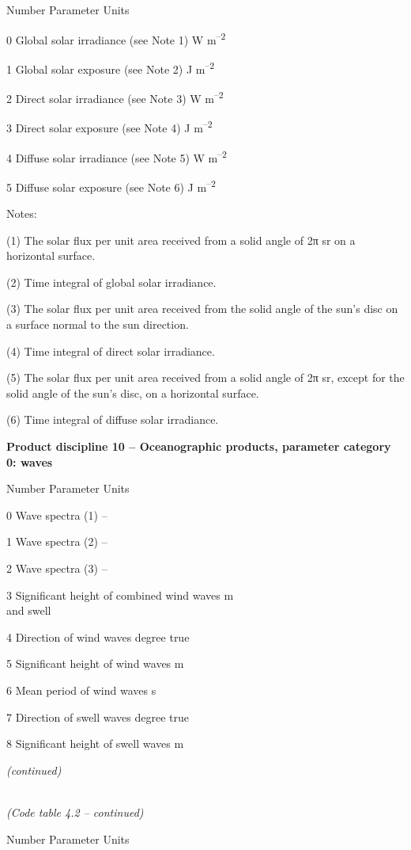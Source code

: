 Number Parameter Units

0 Global solar irradiance (see Note 1) W m\textsuperscript{--2}

1 Global solar exposure (see Note 2) J m\textsuperscript{--2}

2 Direct solar irradiance (see Note 3) W m\textsuperscript{--2}

3 Direct solar exposure (see Note 4) J m\textsuperscript{--2}

4 Diffuse solar irradiance (see Note 5) W m\textsuperscript{--2}

5 Diffuse solar exposure (see Note 6) J m\textsuperscript{--2}

Notes:

(1) The solar flux per unit area received from a solid angle of 2π sr on a horizontal surface.

(2) Time integral of global solar irradiance.

(3) The solar flux per unit area received from the solid angle of the sun's disc on a surface normal to the sun direction.

(4) Time integral of direct solar irradiance.

(5) The solar flux per unit area received from a solid angle of 2π sr, except for the solid angle of the sun's disc, on a horizontal surface.

(6) Time integral of diffuse solar irradiance.

\textbf{Product discipline 10 -- Oceanographic products, parameter category 0: waves}

Number Parameter Units

0 Wave spectra (1) --

1 Wave spectra (2) --

2 Wave spectra (3) --

3 Significant height of combined wind waves m\\
and swell

4 Direction of wind waves degree true

5 Significant height of wind waves m

6 Mean period of wind waves s

7 Direction of swell waves degree true

8 Significant height of swell waves m

\emph{(continued)}

\emph{\\
(Code table 4.2 -- continued)}

Number Parameter Units

